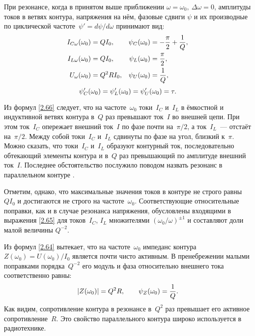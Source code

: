 При резонансе, когда в принятом выше приближении
$\omega=\omega_0,~\Delta\omega=0$, амплитуды токов в ветвях контура, напряжения
на нём, фазовые сдвиги $\psi$ и их производные по циклической частоте~$\psi'=d\psi/d\omega$
принимают вид:
\begin{equation}
\eqmark{2.66}
\begin{aligned}
I_{C\omega}(\omega_0)& =QI_0, &
    \psi_C(\omega_0) & =-\dfrac{\pi}{2}+\frac1Q,\\
I_{L\omega}(\omega_0)&= QI_0, &
        \psi_L(\omega_0)&=\dfrac{\pi}{2},\\
U_{\omega}(\omega_0)&=Q^2RI_0, &
\psi_U(\omega_0)&=\frac1Q,
\end{aligned}
\end{equation}
\begin{equation}
			\eqmark{2.66c}
			\psi'_C(\omega_0)=\psi'_L(\omega_0)=\psi'_U(\omega_0)=\tau.
\end{equation}

Из формул \eqref{2.66} следует, что на частоте~$\omega_0$ 
токи~$I_C$ и~$I_L$ в ёмкостной и индуктивной ветвях контура 
в~$Q$ раз превышают ток~$I$ во внешней цепи. 
При этом ток~$I_C$ опережает внешний ток~$I$ по фазе почти на~$\pi/2$, а
ток~$I_L$~--- отстаёт на~$\pi/2$. Между собой токи~$I_C$ и~$I_L$ сдвинуты по
фазе на угол, близкий к~$\pi$. Можно сказать, что токи~$I_C$ и~$I_L$ образуют
контурный ток, последовательно обтекающий элементы контура и в~$Q$ раз
превышающий по амплитуде внешний ток~$I$. Последнее обстоятельство послужило
поводом назвать резонанс в параллельном контуре .

Отметим, однако, что максимальные значения токов в контуре не строго равны
$QI_0$ и достигаются не строго на частоте~$\omega_0$. Соответствующие
относительные поправки, как и в случае резонанса напряжения, обусловлены
входящими в выражения \eqref{2.65} для токов~$I_C$, $I_L$
множителями $(\omega_0/\omega)^{\pm1}$ и составляют доли малой величины
$Q^{-2}$.

Из формул \eqref{2.64} вытекает, что на частоте~$\omega_0$ импеданс контура
$Z(\omega_0)=U(\omega_0)/I_0$ является почти чисто активным. В
пренебрежении малыми поправками порядка~$Q^{-2}$ его модуль и фаза
относительно внешнего тока соответственно равны:
\begin{equation}\eqmark{2.67}
|Z(\omega_0)|=Q^2R,
\qquad \psi_Z(\omega_0)=\frac1Q.
\end{equation}
Как видим, сопротивление контура в резонансе в~$Q^2$ раз превышает его активное
сопротивление~$R$. Это свойство параллельного контура широко используется в
радиотехнике.

